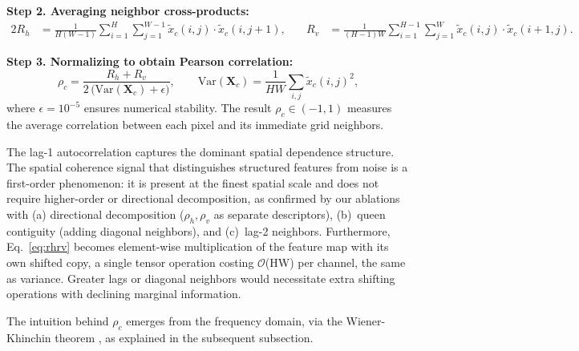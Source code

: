 \documentclass{bmvc2k}
\begin{document}
\noindent\textbf{Step 2. Averaging neighbor cross-products:}
\begin{alignat}{2}
    R_h &= \frac{1}{H(W{-}1)} \sum_{i=1}^{H}\sum_{j=1}^{W-1}
           \tilde{x}_c(i,j)\cdot\tilde{x}_c(i,j{+}1),
    &\quad
    R_v &= \frac{1}{(H{-}1)W} \sum_{i=1}^{H-1}\sum_{j=1}^{W}
           \tilde{x}_c(i,j)\cdot\tilde{x}_c(i{+}1,j).
    \label{eq:rhrv}
\end{alignat}

\noindent\textbf{Step 3. Normalizing to obtain Pearson correlation:}
\begin{equation}\label{eq:rho}
    \rho_c = \frac{R_h + R_v}{2\,\big(\mathrm{Var}(\mathbf{X}_c) + \epsilon\big)}, \qquad \mathrm{Var}(\mathbf{X}_c) = \frac{1}{HW}\sum_{i,j}\tilde{x}_c(i,j)^2,
\end{equation}
where $\epsilon = 10^{-5}$ ensures numerical stability. The result $\rho_c \in (-1, 1)$ measures the average correlation between each pixel and its immediate grid neighbors.

The lag-1 autocorrelation captures the dominant spatial dependence structure. The spatial coherence signal that distinguishes structured features from noise is a first-order phenomenon: it is present at the finest spatial scale and does not require higher-order or directional decomposition, as confirmed by our ablations with (a) directional decomposition ($\rho_h, \rho_v$ as separate descriptors), (b)~queen contiguity (adding diagonal neighbors), and (c)~lag-2 neighbors. Furthermore, Eq.~\ref{eq:rhrv} becomes element-wise multiplication of the feature map with its own shifted copy, a single tensor operation costing $\mathcal{O}$(HW) per channel, the same as variance. Greater lags or diagonal neighbors would necessitate extra shifting operations with declining marginal information.

The intuition behind $\rho_c$ emerges from the frequency domain, via the Wiener-Khinchin theorem \cite{wiener1930, khintchine1934}, as explained in the subsequent subsection.
\end{document}
